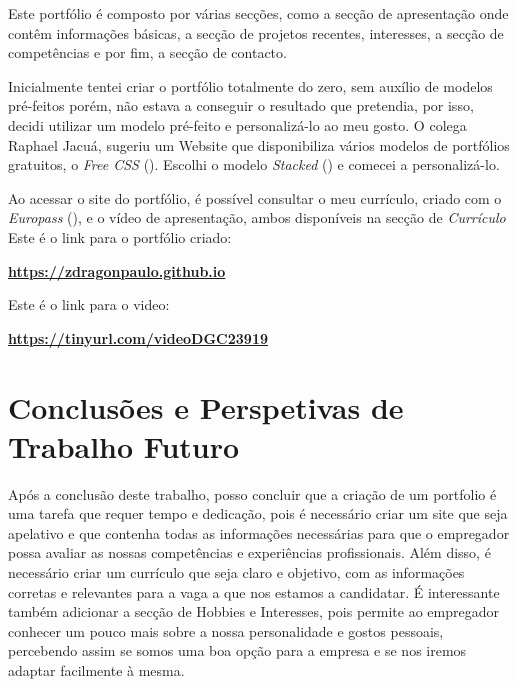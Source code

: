 \documentclass[a4paper]{article}
\begin{document}
Este portfólio é composto por várias secções, como a secção de apresentação onde contêm informações básicas, a secção de projetos recentes, 
interesses, a secção de competências e por fim, a secção de contacto.

Inicialmente tentei criar o portfólio totalmente do zero, sem auxílio de modelos pré-feitos porém, não estava a conseguir o resultado que pretendia,
por isso, decidi utilizar um modelo pré-feito e personalizá-lo ao meu gosto. O colega Raphael Jacuá, sugeriu um Website que disponibiliza vários 
modelos de portfólios gratuitos, o \textit{Free CSS} (\cite{freecss}). Escolhi o modelo \textit{Stacked} (\cite{stacked}) 
e comecei a personalizá-lo.

Ao acessar o site do portfólio, é possível consultar o meu currículo, criado com o \textit{Europass} (\cite{europass}), 
e o vídeo de apresentação, ambos disponíveis na secção de \textit{Currículo}
Este é o link para o portfólio criado: \\
\begin{center} 
    { \large \textbf{\url{https://zdragonpaulo.github.io}}}
\end{center}
Este é o link para o video: \\
\begin{center} 
    { \large \textbf{\url{https://tinyurl.com/videoDGC23919}}}
\end{center}


\newpage
\section{Conclusões e Perspetivas de Trabalho Futuro}\label{con}
Após a conclusão deste trabalho, posso concluir que a criação de um portfolio é uma tarefa que requer tempo e dedicação,
pois é necessário criar um site que seja apelativo e que contenha todas as informações necessárias para que o empregador possa
avaliar as nossas competências e experiências profissionais. Além disso, é necessário criar um currículo que seja claro e objetivo,
com as informações corretas e relevantes para a vaga a que nos estamos a candidatar. É interessante também adicionar a secção de 
Hobbies e Interesses, pois permite ao empregador conhecer um pouco mais sobre a nossa personalidade e gostos pessoais, percebendo 
assim se somos uma boa opção para a empresa e se nos iremos adaptar facilmente à mesma.

\newpage
{}
\printbibliography
\end{document}
